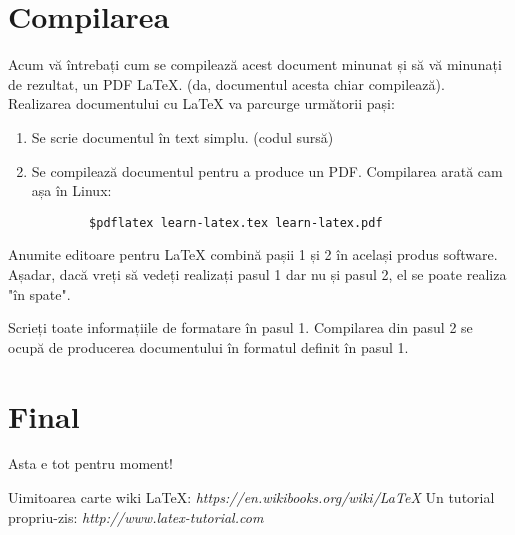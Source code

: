 \documentclass[12pt]{article}
\begin{document}
\section{Compilarea}
Acum vă întrebați cum se compilează acest document minunat și să vă
minunați de rezultat, un PDF LaTeX. (da, documentul acesta chiar
compilează). \\
Realizarea documentului cu LaTeX va parcurge următorii pași:
  \begin{enumerate}
    \item Se scrie documentul în text simplu. (codul sursă)
    \item Se compilează documentul pentru a produce un PDF.
     Compilarea arată cam așa în Linux:\\
     \begin{verbatim}
        $pdflatex learn-latex.tex learn-latex.pdf
     \end{verbatim}
  \end{enumerate}

Anumite editoare pentru LaTeX combină pașii 1 și 2 în același produs software.
Așadar, dacă vreți să vedeți realizați pasul 1 dar nu și pasul 2, el se poate
realiza "în spate".

Scrieți toate informațiile de formatare în pasul 1. Compilarea din pasul 2
se ocupă de producerea documentului în formatul definit în pasul 1.

\section{Final}

Asta e tot pentru moment!

\begin{thebibliography}{1}
   Uimitoarea carte wiki LaTeX: {\em https://en.wikibooks.org/wiki/LaTeX}
   Un tutorial propriu-zis: {\em http://www.latex-tutorial.com}
\end{thebibliography}

\end{document}
